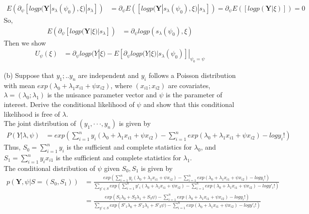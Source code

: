 \documentclass[11pt]{article} %
\begin{document}
\begin{itemize}
	\begin{align*}
		E \left(\partial_{\psi}[log  p(\textbf{Y}|s_{\lambda}(\psi_0), \xi)|s_{\lambda}]\right) & = \partial_{\psi} E \left([log  p(\textbf{Y}|s_{\lambda}(\psi_0), \xi)|s_{\lambda}]\right) = \partial_{\psi} E \left([log  p(\textbf{Y}| \xi)]\right)= 0
	\end{align*}      
	So,
	\begin{align*}
		E \left( \partial_{\psi}[log p(\textbf{Y}| \xi)| s_{\lambda}]\right) &= \partial_{\psi}log p(s_{\lambda}(\psi_0),\xi)
	\end{align*}
	Then we show
	\begin{align*}
		U_{\psi}(\xi) &= \partial_{\psi} log p(Y|\xi)- E[\partial_{\psi} log p(Y|\xi)|s_{\lambda}(\psi_0)]|_{\psi_0=\psi}
	\end{align*} 
	\item[(b)] Suppose that $y_1;.. y_n$ are independent and $y_i$ follows a Poisson distribution with mean $exp(\lambda_0 + \lambda_1x_{i1} +  \psi x_{i2})$, where $(x_{i1}; x_{i2})$ are covariates, $\lambda = (\lambda_0; \lambda_1)$ is the
	nuisance parameter vector and $\psi$  is the parameter of interest. Derive the conditional
	likelihood of $\psi$   and show that this conditional likelihood is free of $\lambda$.\\
	The joint distribution of $(y_1, · · · , y_n)$ is given by 
	\begin{align*}
		P(Y|\lambda, \psi)&=  exp \left( \sum_{i=1}^n y_i(\lambda_0 + \lambda_1x_{i1} +  \psi x_{i2}) - \sum_{i=1}^n exp(\lambda_0 + \lambda_1x_{i1} +  \psi x_{i2}) - log y_i! \right)
	\end{align*}
	Thus, $S_0 = \sum_{i=1}^n y_i$ is the sufficient and complete statistics for $\lambda_0$, and $S_1 = \sum_{i=1}^n y_i x_{i1}$ is the sufficient and complete statistics for $\lambda_1$.\\
	The conditional distribution of $\psi$ given $S_0, S_1$ is given by
	\begin{align*}
		p(\textbf{Y}, \psi|S=(S_0, S_1)) &= \frac{exp \left( \sum_{i=1}^n y_i(\lambda_0 + \lambda_1x_{i1} +  \psi x_{i2}) - \sum_{i=1}^n exp(\lambda_0 + \lambda_1x_{i1} +  \psi x_{i2}) - log y_i! \right)}{\sum_{y' \in S} exp \left( \sum_{i=1}^n y'_i(\lambda_0 + \lambda_1 x_{i1} +  \psi x_{i2}) - \sum_{i=1}^n exp(\lambda_0 + \lambda_1 x_{i1} +  \psi x_{i2}) - log y'_i! \right)}\\
		&= \frac{exp \left( S_1 \lambda_0 + S_2 \lambda_1 +  S_3 \psi) - \sum_{i=1}^n exp(\lambda_0 + \lambda_1x_{i1} +  \psi x_{i2}) - log y_i! \right)}{\sum_{y' \in S} exp \left( S'_1\lambda_0 + S'_2 \lambda_1 + S'_3 \psi) - \sum_{i=1}^n exp(\lambda_0 + \lambda_1 x_{i1} +  \psi x_{i2}) - log y'_i!\right)} \\

\end{align*}
\end{itemize}
\end{document}
